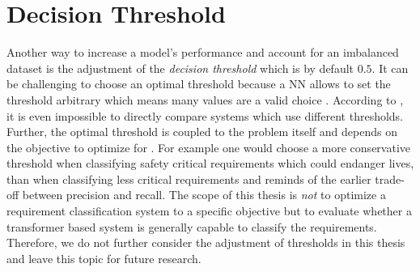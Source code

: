 \section{Decision Threshold}
\label{chp:future_work:sec:decision_threshold}
Another way to increase a model's performance and account for an imbalanced dataset is the adjustment of the \textit{decision threshold} which is by default $0.5$.
It can be challenging to choose an optimal threshold because a \ac{NN} allows to set the threshold arbitrary which means many values are a valid choice \parencite{Mazurowski:2008}.
According to \textcite{Mazurowski:2008}, it is even impossible to directly compare systems which use different thresholds.
Further, the optimal threshold is coupled to the problem itself and depends on the objective to optimize for \parencite{Brown:2019}.
For example one would choose a more conservative threshold when classifying safety critical requirements which could endanger lives, than when classifying less critical requirements and reminds of the earlier trade-off between precision and recall.
The scope of this thesis is \textit{not} to optimize a requirement classification system to a specific objective but to evaluate whether a transformer based system is generally capable to classify the requirements.
Therefore, we do not further consider the adjustment of thresholds in this thesis and leave this topic for future research.
